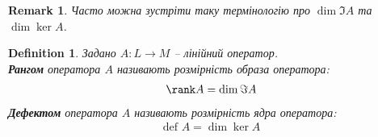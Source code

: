 \documentclass[a4paper, 10pt]{article}
\theoremstyle{theoremdd}
\newtheorem{definition}[theorem]{Definition}
\newtheorem{remark}[theorem]{Remark}
\begin{document}
	\begin{remark}
	Часто можна зустріти таку термінологію про $\dim \Im A$ та $\dim \ker A$.
	\end{remark}
	
	\begin{definition}
Задано $A \colon L \to M$ -- лінійний оператор.\\
\textbf{Рангом} оператора $A$ називають розмірність образа оператора:
\begin{align*}
\rank A = \dim \Im A
\end{align*}
\textbf{Дефектом} оператора $A$ називають розмірність ядра оператора:
\begin{align*}
\textrm{def } A = \dim{\ker A}
\end{align*}
	\end{definition}
	
\end{document}
